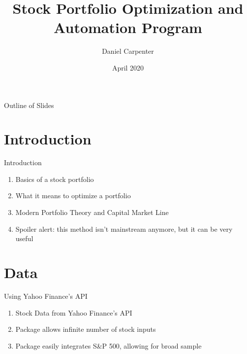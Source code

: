 \documentclass[handout,t]{beamer}
\title[Title]{Stock Portfolio Optimization and Automation Program}
\date{April 2020}
\author[Author]{Daniel Carpenter}
\institute[University]{University of Oklahoma}
\begin{document}
        \frame{\titlepage}
        \section[]{}
        \begin{frame}{Outline of Slides}
        	\tableofcontents
        \end{frame}
    
    \section{Introduction}
        \begin{frame}{Introduction}
        	\begin{doublespacing}
            	\begin{enumerate}
            	    \item Basics of a stock portfolio 
            	    \item What it means to optimize a portfolio 
            	    \item Modern Portfolio Theory and Capital Market Line \citet{Simon2008}
            	    \item Spoiler alert: this method isn't mainstream anymore, but it can be very useful
            	\end{enumerate}
            \end{doublespacing}
        \end{frame}
    
    \section{Data}
        \begin{frame}{Using Yahoo Finance's API}
        	\begin{doublespacing}
            	\begin{enumerate}
            	    \item Stock Data from Yahoo Finance's API
            	    \item Package allows infinite number of stock inputs
            	    \item Package easily integrates S&P 500, allowing for broad sample
            	\end{enumerate}
            \end{doublespacing}
        \end{frame}
        
\end{document}
